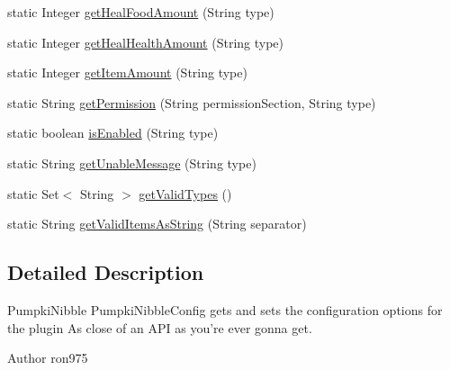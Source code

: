 \begin{DoxyCompactItemize}
\item 
static Integer \hyperlink{classnet_1_1mystia_1_1_pumpki_nibble_1_1_pumpki_nibble_a_p_i_ae38f31f0978ab836efcf7eb87ad70083}{get\-Heal\-Food\-Amount} (String type)
\item 
static Integer \hyperlink{classnet_1_1mystia_1_1_pumpki_nibble_1_1_pumpki_nibble_a_p_i_ae6a19d7e4452f5c4199f290f499f7390}{get\-Heal\-Health\-Amount} (String type)
\item 
static Integer \hyperlink{classnet_1_1mystia_1_1_pumpki_nibble_1_1_pumpki_nibble_a_p_i_a792fb9d4469e67a0dca14ae4d0c17473}{get\-Item\-Amount} (String type)
\item 
static String \hyperlink{classnet_1_1mystia_1_1_pumpki_nibble_1_1_pumpki_nibble_a_p_i_af830a1058cbfdce3867bb76ec3fb9733}{get\-Permission} (String permission\-Section, String type)
\item 
static boolean \hyperlink{classnet_1_1mystia_1_1_pumpki_nibble_1_1_pumpki_nibble_a_p_i_aac02d0acffb3d045fdbed746cd983659}{is\-Enabled} (String type)
\item 
static String \hyperlink{classnet_1_1mystia_1_1_pumpki_nibble_1_1_pumpki_nibble_a_p_i_ab50f2a3a23a3d45b5a1c0117354ecfb9}{get\-Unable\-Message} (String type)
\item 
static Set$<$ String $>$ \hyperlink{classnet_1_1mystia_1_1_pumpki_nibble_1_1_pumpki_nibble_a_p_i_a83f91739357b5326fdd35e3cf8f1f007}{get\-Valid\-Types} ()
\item 
static String \hyperlink{classnet_1_1mystia_1_1_pumpki_nibble_1_1_pumpki_nibble_a_p_i_a6e0a09ba0c5dfbcd859b955106d6d443}{get\-Valid\-Items\-As\-String} (String separator)
\end{DoxyCompactItemize}


\subsection{Detailed Description}
Pumpki\-Nibble Pumpki\-Nibble\-Config gets and sets the configuration options for the plugin As close of an A\-P\-I as you're ever gonna get. \begin{DoxyAuthor}{Author}
ron975 
\end{DoxyAuthor}


